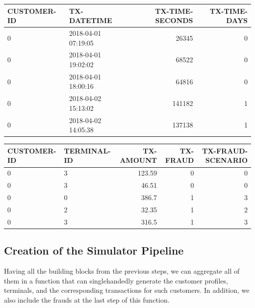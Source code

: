 \begin{center}
\begin{tabular}{llrr}
\toprule
CUSTOMER-ID & TX-DATETIME & TX-TIME-SECONDS & TX-TIME-DAYS \\
\midrule
0 & 2018-04-01 07:19:05 & 26345 & 0 \\
0 & 2018-04-01 19:02:02 & 68522 & 0 \\
0 & 2018-04-01 18:00:16 & 64816 & 0 \\
0 & 2018-04-02 15:13:02 & 141182 & 1 \\
0 & 2018-04-02 14:05:38 & 137138 & 1 \\
\bottomrule
\end{tabular}
\end{center}

\begin{center}
\begin{tabular}{llrrr}
\toprule
CUSTOMER-ID & TERMINAL-ID & TX-AMOUNT & TX-FRAUD & TX-FRAUD-SCENARIO \\
\midrule
0 & 3 & 123.59 & 0 & 0 \\
0 & 3 & 46.51 & 0 & 0 \\
0 & 0 & 386.7 & 1 & 3 \\
0 & 2 & 32.35 & 1 & 2 \\
0 & 3 & 316.5 & 1 & 3 \\
\bottomrule
\end{tabular}
\end{center}


    \hypertarget{creation-of-the-simulator-pipeline}{%
\subsection{Creation of the Simulator
Pipeline}\label{creation-of-the-simulator-pipeline}}

    Having all the building blocks from the previous steps, we can aggregate
all of them in a function that can singlehandedly generate the customer
profiles, terminals, and the corresponding transactions for such
customers. In addition, we also include the frauds at the last step of
this function.

